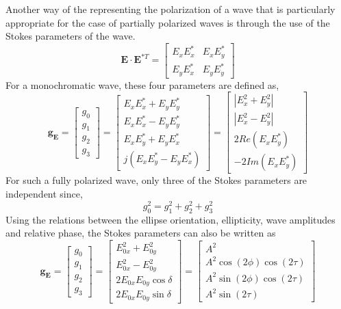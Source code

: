Another way of the representing the polarization of a wave that is particularly appropriate for the case of partially polarized waves is through the use of the Stokes parameters of the wave. 
\begin{equation}
\mathbf{E}\cdot\mathbf{E}^{* T} = \left[
\begin{array}{cc}
E_{x}E^{*}_{x} & E_{x}E^{*}_{y} \\
E_{y}E^{*}_{x} & E_{y}E^{*}_{y}
\end{array}
\right]
\end{equation}
For a monochromatic wave, these four parameters are defined as,
\begin{equation}
\mathbf{g}_\mathbf{E}=\left[\begin{array}{c}
g_0\\
g_1\\
g_2\\
g_3
\end{array}\right]=
\left[
\begin{array}{c}
E_{x}E^{*}_{x}+E_{y}E^{*}_{y}\\
E_{x}E^{*}_{x}-E_{y}E^{*}_{y}\\
E_{x}E^{*}_{y}+E_{y}E^{*}_{x}\\
j(E_{x}E^{*}_{y}-E_{y}E^{*}_{x})
\end{array}\right]=
\left[\begin{array}{c}
|E_x^2 +E_y^2| \\
|E_x^2 -E_y^2|\\
2Re(E_xE_y^*)\\
-2Im(E_xE_y^*)
\end{array}\right]
\end{equation}
For such a fully polarized wave, only three of the Stokes parameters are independent since,
\begin{equation}
g_0^2=g_1^2+g_2^2+g_3^2
\end{equation}
Using the relations between the ellipse orientation, ellipticity, wave amplitudes and relative phase, the Stokes parameters can also be written as
\begin{equation}
\mathbf{g}_\mathbf{E}=\left[\begin{array}{c}
g_{0}\\
g_1\\
g_2\\
g_3
\end{array}\right]=\left[\begin{array}{c}
E_{0x}^2 +E_{0y}^2\\
E_{0x}^2 -E_{0y}^2\\
2E_{0x}E_{0y}\cos\delta\\
2E_{0x}E_{0y}\sin\delta
\end{array}\right] =\left[\begin{array}{c}
A^2\\
A^2\cos(2\phi)\cos(2\tau)\\
A^2\sin(2\phi)\cos(2\tau)\\
A^2\sin(2\tau)
\end{array}\right]
\label{eq:stokes_Phi_Psi}
\end{equation}
